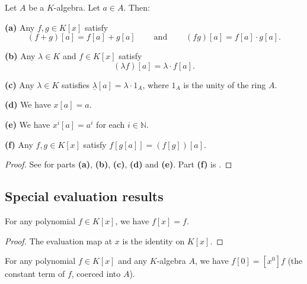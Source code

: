 \begin{theorem}
\label{thm.pol.eval.a+b}
\leantarget
\leanok
Let $A$ be a $K$-algebra. Let $a\in A$. Then: \medskip

\textbf{(a)} Any $f,g\in K\left[  x\right]  $ satisfy%
\[
\left(  f+g\right)  \left[  a\right]  =f\left[  a\right]  +g\left[  a\right]
\ \ \ \ \ \ \ \ \ \ \text{and}\ \ \ \ \ \ \ \ \ \ \left(  fg\right)  \left[
a\right]  =f\left[  a\right]  \cdot g\left[  a\right]  .
\]


\textbf{(b)} Any $\lambda\in K$ and $f\in K\left[  x\right]  $ satisfy%
\[
\left(  \lambda f\right)  \left[  a\right]  =\lambda\cdot f\left[  a\right]
.
\]


\textbf{(c)} Any $\lambda\in K$ satisfies $\underline{\lambda}\left[
a\right]  =\lambda\cdot1_{A}$, where $1_{A}$ is the unity of the ring $A$.
\medskip

\textbf{(d)} We have $x\left[  a\right]  =a$. \medskip

\textbf{(e)} We have $x^{i}\left[  a\right]  =a^{i}$ for each $i\in\mathbb{N}%
$. \medskip

\textbf{(f)} Any $f,g\in K\left[  x\right]  $ satisfy $f\left[  g\left[
a\right]  \right]  =\left(  f\left[  g\right]  \right)  \left[  a\right]  $.
\end{theorem}

\begin{proof}
See \cite[Theorem 7.6.3]{19s} for parts \textbf{(a)}, \textbf{(b)},
\textbf{(c)}, \textbf{(d)} and \textbf{(e)}. Part \textbf{(f)} is
\cite[Proposition 7.6.14]{19s}.
\end{proof}

\subsection{Special evaluation results}

\begin{lemma}
\label{lem.pol.eval.X-self}
\leanhelper
\leanok
For any polynomial $f\in K[x]$, we have $f[x]=f$.
\end{lemma}

\begin{proof}
\leanok
The evaluation map at $x$ is the identity on $K[x]$.
\end{proof}

\begin{lemma}
\label{lem.pol.eval.zero}
\leanhelper
\leanok
For any polynomial $f\in K[x]$ and any $K$-algebra $A$, we have
$f[0]=\left[x^{0}\right]f$ (the constant term of $f$, coerced into $A$).
\end{lemma}


